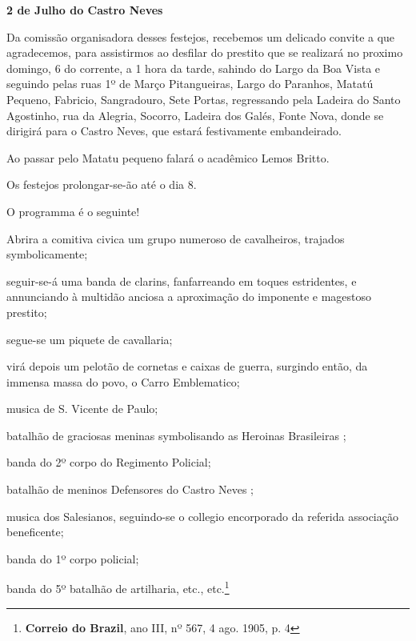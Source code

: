\begin{citacao}
\textbf{2 de Julho do Castro Neves}

Da comissão organisadora desses festejos, recebemos um delicado convite a que agradecemos, para assistirmos ao desfilar do prestito que se realizará no proximo domingo, 6 do corrente, a 1 hora da tarde, sahindo do Largo da Boa Vista e seguindo pelas ruas 1º de Março Pitangueiras, Largo do Paranhos, Matatú Pequeno, Fabricio, Sangradouro, Sete Portas, regressando pela Ladeira do Santo Agostinho, rua da Alegria, Socorro, Ladeira dos Galés, Fonte Nova, donde se dirigirá para o Castro Neves, que estará festivamente embandeirado.

Ao passar pelo Matatu pequeno falará o acadêmico Lemos Britto.

Os festejos prolongar-se-ão até o dia 8.

O programma é o seguinte!

Abrira a comitiva civica um grupo numeroso de cavalheiros, trajados symbolicamente;

seguir-se-á uma banda de clarins, fanfarreando em toques estridentes, e annunciando à multidão anciosa a aproximação do imponente e magestoso prestito;

segue-se um piquete de cavallaria;

virá depois um pelotão de cornetas e caixas de guerra, surgindo então, da immensa massa do povo, o Carro Emblematico;

musica de S. Vicente de Paulo;

batalhão de graciosas meninas symbolisando as \og Heroinas Brasileiras \fg{};

banda do 2º corpo do Regimento Policial;

batalhão de meninos \og Defensores do Castro Neves \fg{};

musica dos Salesianos, seguindo-se o collegio encorporado da referida associação beneficente;

banda do 1º corpo policial;

banda do 5º batalhão de artilharia, etc., etc.\footnote{\textbf{Correio do Brazil}, ano III, nº 567, 4 ago. 1905, p. 4}
\end{citacao}